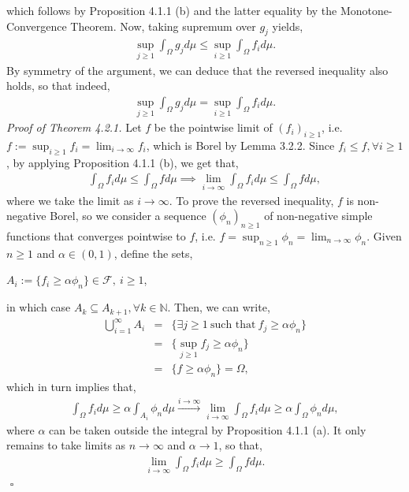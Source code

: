 \documentclass{article}
\begin{document}
which follows by Proposition 4.1.1 (b) and the latter equality by the Monotone-Convergence Theorem. Now, taking supremum over $g_j$ yields,
\begin{eqnarray}
\nonumber
\sup_{j \geq 1} \int_\Omega g_j d\mu \leq \sup_{i \geq 1} \int_\Omega f_i d\mu.
\end{eqnarray}
By symmetry of the argument, we can deduce that the reversed inequality also holds, so that indeed,
\begin{eqnarray}
\nonumber
\sup_{j \geq 1} \int_\Omega g_j d\mu = \sup_{i \geq 1} \int_\Omega f_i d\mu.
\end{eqnarray}
\textit{Proof of Theorem 4.2.1.} Let $f$ be the pointwise limit of $(f_i)_{i\geq1}$, i.e. $f := \sup_{i\geq1}f_i = \lim_{i\to\infty}f_i$, which is Borel by Lemma 3.2.2. Since $f_i \leq f, \forall i \geq 1$, by applying Proposition 4.1.1 (b), we get that,
\begin{eqnarray}
\nonumber
\int_\Omega f_i d\mu \leq \int_\Omega f d\mu \implies \lim_{i\to\infty} \int_\Omega f_i d\mu \leq \int_\Omega f d\mu,
\end{eqnarray}
where we take the limit as $i \to \infty$. To prove the reversed inequality, $f$ is non-negative Borel, so we consider a sequence $(\phi_n)_{n\geq1}$ of non-negative simple functions that converges pointwise to $f$, i.e. $f = \sup_{n\geq1}\phi_n = \lim_{n\to\infty}\phi_n$. Given $n \geq 1$ and $\alpha \in (0,1)$, define the sets,
\begin{center}
	$A_i := \{f_i \geq \alpha\phi_n\} \in \mathcal{F}, \ i\geq1$,
\end{center}
in which case $A_k \subseteq A_{k+1}, \forall k \in \mathbb{N}$. Then, we can write,
\begin{eqnarray}
\nonumber
\bigcup_{i=1}^{\infty}A_i &=& \{\exists j \geq 1 \ \text{such that} \ f_j \geq \alpha\phi_n \}\\
\nonumber
&=& \{\sup_{j \geq 1}f_j \geq \alpha\phi_n\}\\
\nonumber
&=& \{f \geq \alpha\phi_n\} = \Omega,
\end{eqnarray}
which in turn implies that,
\begin{eqnarray}
\nonumber
\int_\Omega f_i d\mu \geq \alpha\int_{A_i} \phi_n d\mu \xrightarrow{i \to \infty} \lim_{i\to\infty} \int_\Omega f_i d\mu \geq \alpha\int_\Omega \phi_n d\mu,
\end{eqnarray}
where $\alpha$ can be taken outside the integral by Proposition 4.1.1 (a). It only remains to take limits as $n \to \infty$ and $\alpha \to 1$, so that,
\begin{eqnarray}
\nonumber
\lim_{i \to \infty} \int_\Omega f_i d\mu \geq \int_\Omega f d\mu.
\end{eqnarray}
${}$ \hfill $\square$
\end{document}
